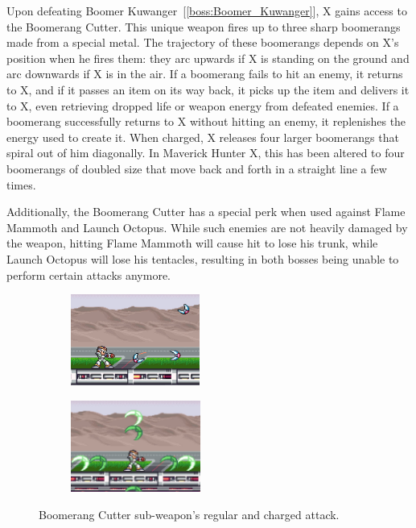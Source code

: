Upon defeating Boomer Kuwanger~[\ref{boss:Boomer_Kuwanger}], X gains access to the Boomerang Cutter. This unique weapon fires up to three sharp boomerangs~\cite{wiki:Boomerang_cutter} made from a special metal. The trajectory of these boomerangs depends on X's position when he fires them: they arc upwards if X is standing on the ground and arc downwards if X is in the air. If a boomerang fails to hit an enemy, it returns to X, and if it passes an item on its way back, it picks up the item and delivers it to X, even retrieving dropped life or weapon energy from defeated enemies. If a boomerang successfully returns to X without hitting an enemy, it replenishes the energy used to create it. When charged, X releases four larger boomerangs that spiral out of him diagonally. In Maverick Hunter X, this has been altered to four boomerangs of doubled size that move back and forth in a straight line a few times.

Additionally, the Boomerang Cutter has a special perk when used against Flame Mammoth and Launch Octopus. While such enemies are not heavily damaged by the weapon, hitting Flame Mammoth will cause hit to lose his trunk, while Launch Octopus will lose his tentacles, resulting in both bosses being unable to perform certain attacks anymore.

\begin{figure}[htp]
	\centering
	\begin{subfigure}{0.4\linewidth}
		\includegraphics[height=3cm]{figures/X1/weapons/Boomerang_1.jpg}
	\end{subfigure}
	\begin{subfigure}{0.4\linewidth}
		\includegraphics[height=3cm]{figures/X1/weapons/Boomerang_2.jpg}
	\end{subfigure}
	\caption{Boomerang Cutter sub-weapon's regular and charged attack.}
\end{figure}

